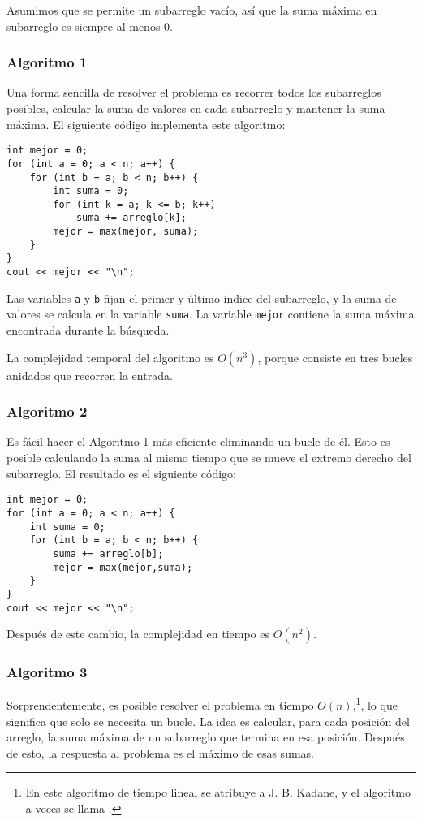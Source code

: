 Asumimos que se permite un subarreglo vacío,
así que la suma máxima en subarreglo es siempre al menos $0$.

\subsubsection{Algoritmo 1}

Una forma sencilla de resolver el problema
es recorrer todos los subarreglos posibles,
calcular la suma de valores en cada subarreglo y mantener
la suma máxima.
El siguiente código implementa este algoritmo:

\begin{lstlisting}
int mejor = 0;
for (int a = 0; a < n; a++) {
    for (int b = a; b < n; b++) {
        int suma = 0;
        for (int k = a; k <= b; k++)
            suma += arreglo[k];
        mejor = max(mejor, suma);
    }
}
cout << mejor << "\n";
\end{lstlisting}

Las variables \texttt{a} y \texttt{b} fijan el primer y
último índice del subarreglo,
y la suma de valores se calcula en la variable \texttt{suma}.
La variable \texttt{mejor} contiene la suma máxima encontrada durante la búsqueda.

La complejidad temporal del algoritmo es $O(n^3)$,
porque consiste en tres bucles anidados
que recorren la entrada.

\subsubsection{Algoritmo 2}

Es fácil hacer el Algoritmo 1 más eficiente
eliminando un bucle de él.
Esto es posible calculando la suma al mismo
tiempo que se mueve el extremo derecho del subarreglo.
El resultado es el siguiente código:

\begin{lstlisting}
int mejor = 0;
for (int a = 0; a < n; a++) {
    int suma = 0;
    for (int b = a; b < n; b++) {
        suma += arreglo[b];
        mejor = max(mejor,suma);
    }
}
cout << mejor << "\n";
\end{lstlisting}
Después de este cambio, la complejidad en tiempo es $O(n^2)$.

\subsubsection{Algoritmo 3}

Sorprendentemente, es posible resolver el problema
en tiempo $O(n)$,\footnote{En \cite{ben86} este algoritmo de tiempo lineal
    se atribuye a J. B. Kadane, y el algoritmo a veces se
    llama  .}, lo que significa
que solo se necesita un bucle.
La idea es calcular, para cada posición del arreglo,
la suma máxima de un subarreglo que termina en esa posición.
Después de esto, la respuesta al problema es el
máximo de esas sumas.

